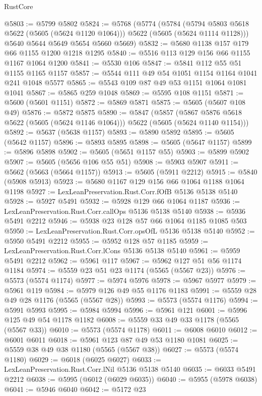 \begin{lexlean}{RustCore}
\begin{coremodule}
@5803 := @5799 @5802
@5824 := @5768
    (@5774
      (@5784
        (@5794 @5803 @5618 @5622 (@5605 (@5624 @1120 @1064)))
        @5622
        (@5605 (@5624 @1114 @1128)))
      @5640
      @5644
      @5649
      @5654
      @5660
      @5669)
@5832 := @5680 @1138 @157 @179 @66 @1155 @1200 @1218 @1295
@5840 := @5516 @113 @129 @156 @66 @1155 @1167 @1064 @1200
@5841 := @5530 @106
@5847 := @5841 @112 @55 @51 @1155 @1165 @1157
@5857 := @5544 @111 @49 @54 @1051 @1154 @1164 @1041 @241 @1048 @5577
@5865 := @5543 @109 @87 @49 @53 @1151 @1064 @1081 @1041
@5867 := @5865 @259 @1048
@5869 := @5595 @108 @1151
@5871 := @5600 (@5601 @1151)
@5872 := @5869 @5871
@5875 := @5605 (@5607 @108 @49)
@5876 := @5872 @5875
@5890 := @5847
    (@5857 (@5867 @5876 @5618 @5622 (@5605 (@5624 @1146 @1064))) @5622 (@5605 (@5624 @1140 @1154)))
@5892 := @5637 (@5638 @1157)
@5893 := @5890 @5892
@5895 := @5605 (@5642 @1157)
@5896 := @5893 @5895
@5898 := @5605 (@5647 @1157)
@5899 := @5896 @5898
@5902 := @5605 (@5651 @1157 @55)
@5903 := @5899 @5902
@5907 := @5605 (@5656 @106 @55 @51)
@5908 := @5903 @5907
@5911 := @5662 (@5663 (@5664 @1157))
@5913 := @5605 (@5911 @2212)
@5915 := @5840 (@5908 @5913)
@5923 := @5680 @1167 @129 @156 @66 @1064 @1188 @1064 @1198
@5927 := LexLeanPreservation.Rust.Corr.fOfB @5136 @5138 @5140
@5928 := @5927 @5491
@5932 := @5928 @129 @66 @1064 @1187
@5936 := LexLeanPreservation.Rust.Corr.callOps @5136 @5138 @5140
@5938 := @5936 @5491 @2212
@5946 := @5938 @23 @128 @57 @66 @1064 @1185 @1085 @503
@5950 := LexLeanPreservation.Rust.Corr.opsOfL @5136 @5138 @5140
@5952 := @5950 @5491 @2212
@5955 := @5952 @128 @57 @1185
@5959 := LexLeanPreservation.Rust.Corr.lCons @5136 @5138 @5140
@5961 := @5959 @5491 @2212
@5962 := @5961 @117
@5967 := @5962 @127 @51 @56 @1174 @1184
@5974 := @5559 @23 @51 @23 @1174 (@5565 (@5567 @23))
@5976 := @5573 (@5574 @1174)
@5977 := @5974 @5976
@5978 := @5967 @5977
@5979 := @5961 @119
@5984 := @5979 @126 @49 @55 @1176 @1183
@5991 := @5559 @28 @49 @28 @1176 (@5565 (@5567 @28))
@5993 := @5573 (@5574 @1176)
@5994 := @5991 @5993
@5995 := @5984 @5994
@5996 := @5961 @121
@6001 := @5996 @125 @49 @54 @1178 @1182
@6008 := @5559 @33 @49 @33 @1178 (@5565 (@5567 @33))
@6010 := @5573 (@5574 @1178)
@6011 := @6008 @6010
@6012 := @6001 @6011
@6018 := @5961 @123 @87 @49 @53 @1180 @1081
@6025 := @5559 @38 @49 @38 @1180 (@5565 (@5567 @38))
@6027 := @5573 (@5574 @1180)
@6029 := @6018 (@6025 @6027)
@6033 := LexLeanPreservation.Rust.Corr.lNil @5136 @5138 @5140
@6035 := @6033 @5491 @2212
@6038 := @5995 (@6012 (@6029 @6035))
@6040 := @5955 (@5978 @6038)
@6041 := @5946 @6040
@6042 := @5172 @23

\end{coremodule}
\end{lexlean}
